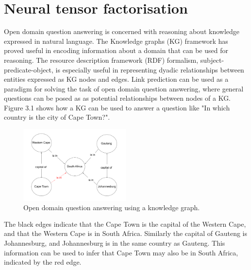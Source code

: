 \chapter{Neural tensor factorisation}


\ifpdf
     \graphicspath{{Figs/Chapter3/}}
\else
    \graphicspath{{Chapter3/Figs/Vector/}{Chapter3/Figs/}}
\fi


Open domain question answering is concerned with reasoning about knowledge expressed in natural language. The Knowledge graphs (KG) framework has proved useful in encoding information about a domain that can be used for reasoning. The resource description framework (RDF) formalism, subject-predicate-object, is especially useful in representing dyadic relationships between entities expressed as KG nodes and edges. Link prediction can be used as a paradigm for solving the task of open domain question answering, where general questions can be posed as as potential relationships between nodes of a KG. Figure 3.1 shows how a KG can be used to answer a question like "In which country is the city of Cape Town?". 

\begin{figure}[H]
   	\centering
    	\includegraphics[width=0.5\textwidth]{Open_domain_question_answering_using_a_knowledge_graph.png}
	\caption{Open domain question answering using a knowledge graph.}
\end{figure}

\noindent The black edges indicate that the Cape Town is the capital of the Western Cape, and that the Western Cape is in South Africa. Similarly the capital of Gauteng is Johannesburg, and Johannesburg is in the same country as Gauteng. This information can be used to infer that Cape Town may also be in South Africa, indicated by the red edge. \par

